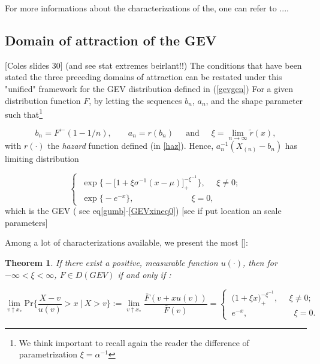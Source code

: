 \documentclass[11pt,a4paper,openany ]{book}
\newtheorem{theorem}{Theorem}[chapter]
\begin{document}
For more informations about the characterizations of the, one can refer to ....

\subsection{Domain of attraction of the GEV}
[Coles slides 30] (and see stat extremes beirlant!!) The conditions that have been stated the three preceding domains of attraction can be restated under this "unified" framework for the GEV distribution defined in (\ref{gevgen})
For a given distribution function $F$, by letting the sequences $b_n$, $a_n$, and the shape parameter such that\footnote{We think important to recall again the reader the difference of parametrization $\xi=\alpha^{-1}$}

\begin{equation*}
b_n=F^{\leftarrow}(1-1/n)\text{, } \ \ \ \ \ \ \ \ a_n=r(b_n) \ \ \ \ \ \text{ and } \ \ \ \ \ \xi=\displaystyle{\lim_{n \to \infty}}\tilde{r}(x),
\end{equation*}
with $r(\cdot)$ the \emph{hazard} function defined (in \ref{haz}). Hence, $a_n^{-1}(X_{(n)}-b_n)$ has limiting distribution

\begin{equation*}
\begin{cases}
\ \exp\Big\{-\big[1+\xi\sigma^{-1}(x-\mu)\big]_+^{-\xi^{-1}}\Big\}, \ \ \ \ \ \ \xi\neq 0; 
\\
\ \exp\big\{-e^{-x}\big\}, \ \ \ \ \ \ \ \ \ \ \ \ \ \ \ \ \ \ \ \ \ \ \ \ \ \ \ \ \  \  \ \xi=0,
\end{cases}
\end{equation*}
which is the GEV ( see eq\ref{gumb}-\ref{GEVxineq0}) [see if put location an scale parameters]

Among a lot of characterizations available, we present the most []:
\begin{theorem}
	If there exist a positive, measurable function $u(\cdot)$, then for $-\infty<\xi<\infty$, $F\in D(GEV)$ if and only if :
	
	\begin{equation}
	\displaystyle{\lim_{v \uparrow x_*}} \text{Pr} \Bigg\{\frac{X-v}{u(v)}>x \ | \ X>v\Bigg\}:=\displaystyle{\lim_{v \uparrow x_*}}\frac{\bar{F}(v+xu(v))}{\bar{F}(v)}=\begin{cases}
	\ \Big(1+\xi x\Big)_+^{-\xi^{-1}}, \ \ \ \ \ \ \xi\neq 0;    \\
	\  e^{-x}, \ \ \ \ \ \ \ \ \ \ \ \ \ \ \ \ \qquad \xi=0.
	\end{cases}
	\end{equation}

\end{theorem}
\end{document}
